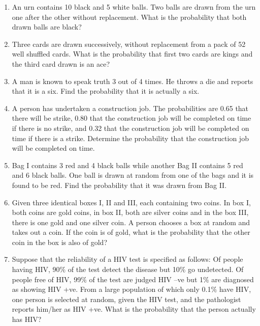 \begin{enumerate}[label=\thesection.\arabic*.,ref=\thesection.\theenumi]
\item An urn contains 10 black and 5 white balls. Two balls are drawn from the urn one after the other without replacement. What is the probability that both drawn balls are black?\\

\item Three cards are drawn successively, without replacement from a pack of 52 well shuffled cards. What is the probability that first two cards are kings and the third card drawn is an ace?\\

\item A man is known to speak truth 3 out of 4 times. He throws a die and reports that it is a six. Find the probability that it is actually a six.\\

\item A person has undertaken a construction job. The probabilities are 0.65 that there will be strike, 0.80 that the construction job will be completed on time if there is no strike, and 0.32 that the construction job will be completed on time if there is a strike. Determine the probability that the construction job will be completed on time.\\
\solution


\item Bag I contains 3 red and 4 black balls while another Bag II contains 5 red and 6 black balls. One ball is drawn at random from one of the bags and it is found to be red. Find the probability that it was drawn from Bag II.\\
\solution


\item Given three identical boxes I, II and III, each containing two coins. In box I, both coins are gold coins, in box II, both are silver coins and in the box III, there is one gold and one silver coin. A person chooses a box at random and takes out a coin. If the coin is of gold, what is the probability that the other coin in the box is also of gold?\\
\solution


\item Suppose that the reliability of a HIV test is specified as follows: Of people having HIV, 90$\%$ of the test detect the disease but 10$\%$ go undetected. Of people free of HIV, 99$\%$ of the test are judged HIV –ve but 1$\%$ are diagnosed as showing HIV +ve. From a large population of which only 0.1$\%$ have HIV, one person is selected at random, given the HIV test, and the pathologist reports him/her as HIV +ve. What is the probability that the person actually has HIV?\\
\solution



\end{enumerate}
